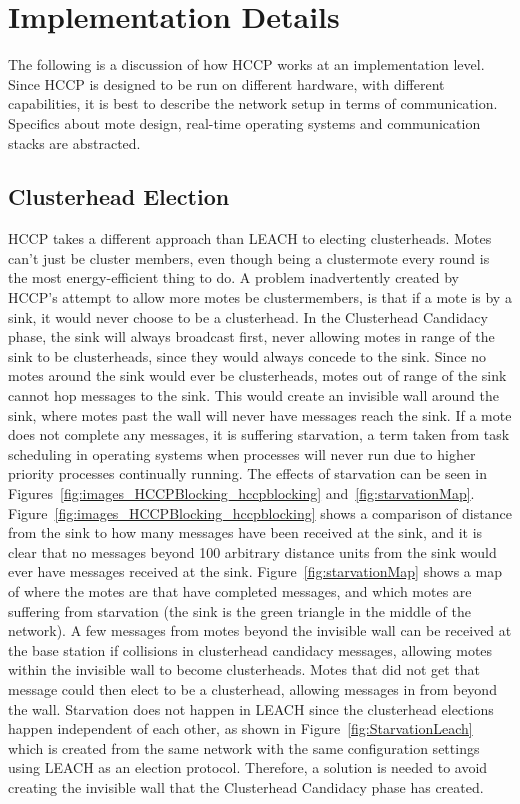 \section{Implementation Details}
\label{ch:implementation}

The following is a discussion of how HCCP works at an implementation level.
Since HCCP is designed to be run on different hardware, with
different capabilities, it is best to describe the network
setup in terms of communication. Specifics about mote design,
real-time operating systems and communication stacks are abstracted. 


\subsection{Clusterhead Election}


HCCP takes a different approach than LEACH to electing clusterheads.
Motes can't just be cluster members, even though being a clustermote every round
is the most energy-efficient thing to do. 
A problem inadvertently created by HCCP's attempt to allow more motes
be clustermembers, is that if a mote is by a sink, it would never choose to be a clusterhead. 
In the Clusterhead Candidacy phase, the sink will always broadcast first, never allowing
motes in range of the sink to be clusterheads, since they would always concede to the sink.
Since no motes
around the sink would ever be clusterheads,
motes out of range of the sink cannot hop messages to the sink. This would create an invisible wall around the sink, where motes past
the wall will never have messages reach the sink. If a mote does not complete any messages, it is
suffering starvation, a term taken from task scheduling in operating systems when processes will never run due
to higher priority processes continually running.
The effects of starvation can be seen in Figures~\ref{fig:images_HCCPBlocking_hccpblocking} and~\ref{fig:starvationMap}.
Figure~\ref{fig:images_HCCPBlocking_hccpblocking} shows a comparison of distance from the sink to how many messages have been 
received at the sink, and it is clear that no messages beyond 100 arbitrary distance units from the sink would ever have 
messages received at the sink.
Figure~\ref{fig:starvationMap} shows a map of where the motes are that have completed messages, and which motes are 
suffering from starvation (the sink is the green triangle in the middle of the network).
A few messages from motes beyond the invisible wall can be received at the base station if
collisions in clusterhead candidacy messages, allowing motes within the invisible wall to become clusterheads. Motes that 
did not get that message could then elect to be a clusterhead, allowing messages in 
from beyond the wall. Starvation does not happen in LEACH since the clusterhead elections happen 
independent of each other, as shown in Figure~\ref{fig:StarvationLeach} which is created from the 
same network with the same configuration settings using LEACH as an election protocol. 
Therefore, a solution is needed to avoid creating the invisible wall that 
the Clusterhead Candidacy phase has created.

